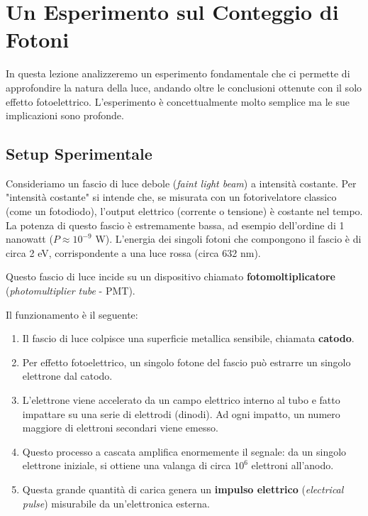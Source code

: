 \section{Un Esperimento sul Conteggio di Fotoni}

In questa lezione analizzeremo un esperimento fondamentale che ci permette di approfondire la natura della luce, andando oltre le conclusioni ottenute con il solo effetto fotoelettrico. L'esperimento è concettualmente molto semplice ma le sue implicazioni sono profonde.

\subsection{Setup Sperimentale}

Consideriamo un fascio di luce debole (\textit{faint light beam}) a intensità costante. Per "intensità costante" si intende che, se misurata con un fotorivelatore classico (come un fotodiodo), l'output elettrico (corrente o tensione) è costante nel tempo. La potenza di questo fascio è estremamente bassa, ad esempio dell'ordine di 1 nanowatt ($P \approx 10^{-9}$ W). L'energia dei singoli fotoni che compongono il fascio è di circa 2 eV, corrispondente a una luce rossa (circa 632 nm).

Questo fascio di luce incide su un dispositivo chiamato \textbf{fotomoltiplicatore} (\textit{photomultiplier tube} - PMT).


Il funzionamento è il seguente:
\begin{enumerate}
    \item Il fascio di luce colpisce una superficie metallica sensibile, chiamata \textbf{catodo}.
    \item Per effetto fotoelettrico, un singolo fotone del fascio può estrarre un singolo elettrone dal catodo.
    \item L'elettrone viene accelerato da un campo elettrico interno al tubo e fatto impattare su una serie di elettrodi (dinodi). Ad ogni impatto, un numero maggiore di elettroni secondari viene emesso.
    \item Questo processo a cascata amplifica enormemente il segnale: da un singolo elettrone iniziale, si ottiene una valanga di circa $10^6$ elettroni all'anodo.
    \item Questa grande quantità di carica genera un \textbf{impulso elettrico} (\textit{electrical pulse}) misurabile da un'elettronica esterna.
\end{enumerate}

